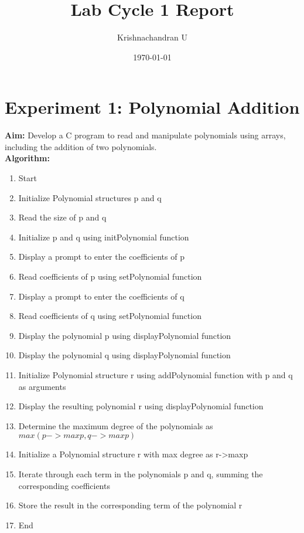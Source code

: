 \documentclass{article}
\title{Lab Cycle 1 Report}
\author{Krishnachandran U}
\date{\today}
\begin{document}
\maketitle

\tableofcontents %

\clearpage
\section{Experiment 1: Polynomial Addition}
\textbf{Aim:} Develop a C program to read and manipulate polynomials using arrays, including the addition of two polynomials.
\\
\textbf{Algorithm:}
\begin{enumerate}
  \item Start
  \item Initialize Polynomial structures p and q
  \item Read the size of p and q
  \item Initialize p and q using initPolynomial function
  \item Display a prompt to enter the coefficients of p
  \item Read coefficients of p using setPolynomial function
  \item Display a prompt to enter the coefficients of q
  \item Read coefficients of q using setPolynomial function
  \item Display the polynomial p using displayPolynomial function
  \item Display the polynomial q using displayPolynomial function
  \item Initialize Polynomial structure r using addPolynomial function with p and q as arguments
  \item Display the resulting polynomial r using displayPolynomial function
  \item Determine the maximum degree of the polynomials as $max(p->maxp, q->maxp)$
  \item Initialize a Polynomial structure r with max degree as r->maxp
  \item Iterate through each term in the polynomials p and q, summing the corresponding coefficients
  \item Store the result in the corresponding term of the polynomial r
  \item End
\end{enumerate}
\end{document}

